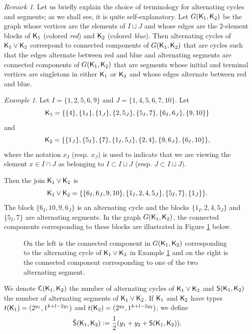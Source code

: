 \documentclass[11pt, a4paper, oneside, reqno]{amsart}
\newcommand{\sK}{{\sf K}}
\theoremstyle{remark}
\newtheorem{remark}[theorem]{Remark}
\newtheorem{example}[theorem]{Example}
\theoremstyle{definition}
\numberwithin{equation}{section}
\begin{document}
\begin{remark}
Let us briefly explain the choice of terminology for alternating cycles and segments; as we shall see, it is quite self-explanatory. Let $G(\sK_1, \sK_2)$ be the graph whose vertices are the elements of $I\sqcup J$ and whose edges are the 2-element blocks of $\sK_1$ (colored \emph{red}) and $\sK_2$ (colored \emph{blue}). Then alternating cycles of $\sK_1 \vee \sK_2$ correspond to connected components of $G(\sK_1, \sK_2)$ that are cycles such that the edges alternate between red and blue and alternating segments are connected components of $G(\sK_1, \sK_2)$ that are segments whose initial and terminal vertices are singletons in either $\sK_1$ or $\sK_2$ and whose edges alternate between red and blue.
\end{remark}
\begin{example}
\label{ex:ExampleCyclesSegments}
    Let $I = \{1,2,5,6,9\}$ and $J = \{1,4,5,6,7,10\}$. Let 
    $$\sK_1 = \{\{4\},\{1_I\},\{1_J\},\{2,5_J\},\{5_I,7\}, \{6_I,6_J\},\{9,10\}\}
    $$ and 
    $$\sK_2 = \{\{1_J\}, \{5_I\}, \{7\}, \{1_I,5_J\},\{2,4\},\{9,6_J\},\{6_I,10\}\},$$
    where the notation $x_I$ (resp. $x_J$) is used to indicate that we are viewing the element $x \in I\cap J$ as belonging to $I \subset I \sqcup J$ (resp. $J \subset I \sqcup J)$.
    
    Then the join $\sK_1 \vee \sK_2$ is
    $$\sK_1 \vee \sK_2 = \{\{6_I,6_J,9,10\},\{1_I,2,4,5_J\}, \{5_I,7\}, \{1_J\}\}.
    $$
    The block $\{6_I, 10, 9, 6_J\}$ is an alternating cycle and the blocks $\{1_I,2,4,5_J\}$ and $\{5_I,7\}$ are alternating segments. In the graph $G(\sK_1, \sK_2)$, the connected components corresponding to these blocks are illustrated in Figure \ref{fig:CyclesAndSegments} below.
\begin{figure}[h]
    \centering
      \def\svgwidth{0.5\linewidth}
     
    \caption{On the left is the connected component in $G(\sK_1, \sK_2)$ corresponding to the alternating cycle of $\sK_1 \vee \sK_2$ in Example \ref{ex:ExampleCyclesSegments} and on the right is the connected component corresponding to one of the two alternating segment.}
    \label{fig:CyclesAndSegments}
\end{figure}
\end{example}



We denote ${\sf C}({\sf K}_1, {\sf K}_2)$ the number of alternating cycles of $\sK_1 \vee \sK_2 $ and ${\sf S}({\sf K}_1, {\sf K}_2)$ the number of alternating segments of $\sK_1 \vee \sK_2$. If $\sK_1$ and $\sK_2$ have types $t(\sK_1) = (2^{y_1},1^{k+l-2y_1})$ and $t(\sK_2) = (2^{y_2},1^{k+l-2y_2})$, we define 
$$
	\tilde{\sf S}(\sK_1, \sK_2) \vcentcolon= \frac{1}{2}(y_1+y_2+{\sf S}(\sK_1, \sK_2)).
$$
\newcommand{\tildeS}[2]{\tilde{\sf S}(#1,#2)}
\end{document}
